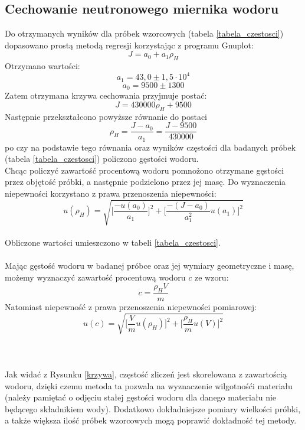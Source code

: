 \documentclass{article}
\begin{document}
\subsection{Cechowanie neutronowego miernika wodoru}
Do otrzymanych wyników dla próbek wzorcowych (tabela \ref{tabela_czestosci}) dopasowano prostą metodą regresji korzystając z programu Gnuplot:
\begin{equation}
	J = a_0 + a_1\rho_H
\end{equation}
 Otrzymano wartości:
 \begin{equation*}
 	a_1 = 43,0 \pm 1,5\cdot 10^4
 \end{equation*}
 \begin{equation*}
 	a_0 = 9500 \pm 1300
 \end{equation*}
Zatem otrzymana krzywa cechowania przyjmuje postać:
\begin{equation*}
	J = 430000\rho_H + 9500
\end{equation*}
Następnie przekształcono powyższe równanie do postaci\\
\[\rho _H = \frac{J-a_0}{a_1} = \frac{J-9500}{430000}
\]
po czy na podstawie tego równania oraz wyników częstości dla badanych próbek (tabela \ref{tabela_czestosci}) policzono gęstości wodoru. \\
Chcąc policzyć zawartość procentową wodoru pomnożono otrzymane gęstości przez objętość próbki, a następnie podzielono przez jej masę. Do wyznaczenia niepewności korzystano z prawa przenoszenia niepewności:
\[u(\rho _H) = \sqrt{ \Bigg[ \frac{-u(a_0)}{a_1} \Bigg]^2 + \Bigg[ \frac{-(J-a_0)}{a_1^2}u(a_1) \Bigg]^2 }
\]\\

\noindent
Obliczone wartości umieszczono w tabeli \ref{tabela_czestosci}.\\\\
Mając gęstość wodoru w badanej próbce oraz jej wymiary geometryczne i masę, możemy wyznaczyć zawartość 
procentową wodoru $c$ ze wzoru:
\begin{equation}
c = \frac{\rho _H V}{m}
\end{equation}
Natomiast niepewność z prawa przenoszenia niepewności pomiarowej:
\begin{equation}
u(c) = \sqrt{ \Big[ \frac{V}{m}u(\rho _H) \Big]^2 + \Big[ \frac{\rho _H}{m}u(V) \Big]^2}
\end{equation}\\\\\\

Jak widać z Rysunku \ref{krzywa}, częstość zliczeń jest skorelowana z zawartością wodoru, dzięki czemu metoda ta pozwala na wyznaczenie wilgotnośći materiału (należy pamiętać o odjęciu stałej gęstości wodoru dla danego materiału nie będącego składnikiem wody). Dodatkowo dokładniejsze pomiary wielkości próbki, a także większa ilość próbek wzorcowych mogą poprawić dokładność tej metody.
\end{document}
